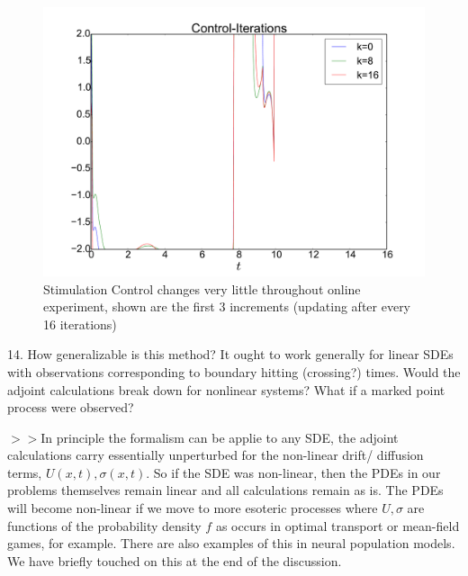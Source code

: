 \documentclass[12pt]{article}
\begin{document}
\begin{figure}[htp]
\begin{center}
  \includegraphics[width=.8\textwidth]{Figs/HTOnlineEstimator/single_experiment_example_controls_evolution.pdf}
  \caption[]{Stimulation Control changes very little throughout   online
  experiment, shown are the first 3 increments (updating after every 16
  iterations)}
  \label{fig:control_iterates}
\end{center}
\end{figure}
 
14. How generalizable is this method? It ought to work generally for linear SDEs
with observations corresponding to boundary hitting (crossing?) times. Would the
adjoint calculations break down for nonlinear systems? What if a marked point
process were observed?

$>> $In principle the formalism can be applie to any SDE, the adjoint
calculations carry essentially unperturbed for the non-linear drift/ diffusion
terms, $U(x,t), \sigma(x,t)$. So if the SDE was non-linear, then the PDEs in our
problems themselves remain linear and all calculations remain as is. The PDEs
will become non-linear if we move to more esoteric processes where $U,\sigma$
are functions of the probability density $f$ as occurs in optimal transport or
mean-field games, for example. There are also examples of this in neural
population models. We have briefly touched on this at the end of the discussion.
\end{document}
